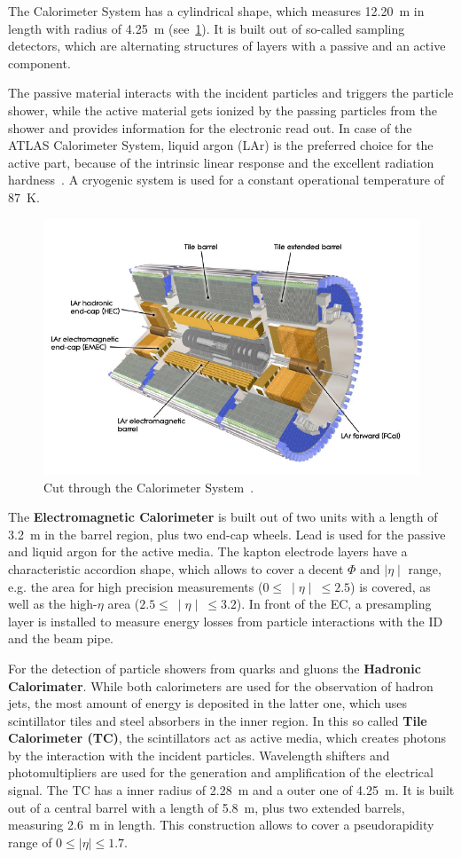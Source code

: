 The Calorimeter System has a  cylindrical shape, which measures 12.20~m in length with radius of 4.25~m (see~\cref{fig:35}). It is built out of so-called sampling detectors, which are alternating structures of layers with a passive and an active component.

 The passive material interacts with the incident particles and triggers the particle shower, while the active material gets ionized by the passing particles from the shower and provides information for the electronic read out. In case of the ATLAS Calorimeter System, liquid argon (LAr) is the preferred choice for the active part, because of the intrinsic linear response and the excellent radiation hardness~\cite{Aad:2008zzm}. A cryogenic system is used for a constant operational temperature of 87~K.


\begin{figure}[h]
	\centering
	\includegraphics[width=0.65\linewidth]{Pics/cp3/35}
	\caption{Cut through the Calorimeter  System~\cite{Aad:2008zzm}.} 
	\label{fig:35}
	\end{figure}



 The \textbf{Electromagnetic Calorimeter} is built out of two units with a length of 3.2~m in the barrel region, plus two end-cap wheels. Lead is used for the passive and liquid argon for the active media. The kapton electrode layers have a characteristic accordion shape, which allows to cover a decent $\Phi$  and $\mid\eta\mid$ range, e.g. the area for high precision measurements  ($0 \leq~  \mid\eta\mid ~\leq 2.5$) is covered, as well as the high-$\eta$ area  ($2.5 \leq~ \mid\eta\mid~ \leq3.2$). In front of the EC, a presampling layer is installed to measure energy losses  from particle interactions with the ID and the beam pipe.




For the detection of particle showers from quarks and gluons the \textbf{Hadronic Calorimater}. While both calorimeters are used for the observation of hadron jets, the most amount of energy is deposited in the latter one, which uses scintillator tiles and steel absorbers in the inner region. In this so called \textbf{Tile Calorimeter (TC)}, the scintillators act as active media, which creates photons by the interaction with the incident particles. Wavelength shifters and photomultipliers are  used for the generation and amplification of the electrical signal. The TC has a inner radius of 2.28~m and a outer one of 4.25~m. It is built out of a central barrel with a length of 5.8~m, plus two extended barrels, measuring 2.6~m in length. This construction  allows to cover a pseudorapidity range of $0 \leq \mid\eta\mid \leq1.7$.

